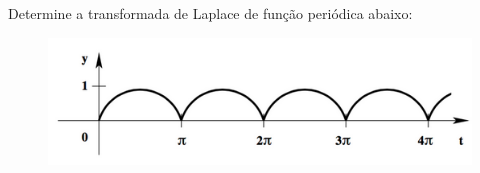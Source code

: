 \linespread{1.5}

Determine a transformada de Laplace de função periódica abaixo:
\begin{figure}[H]
    \centering
    \includegraphics[width =0.7\linewidth]{fig/tl21.png}
\end{figure}
